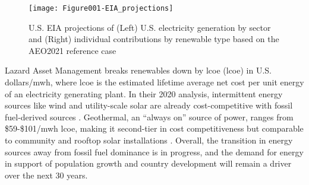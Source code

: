 \begin{figure}[htp]
\centering
\texttt{[image: Figure001-EIA\_projections]}
\caption[U.S. EIA projections based on the AEO2021 reference case]{U.S. EIA projections of (Left) U.S. electricity generation by sector and (Right) individual contributions by renewable type based on the AEO2021 reference case \protect\citep{us_energy_information_administration_annual_2021}}
\label{fig:eia_2021_projections}
\end{figure}

Lazard Asset Management breaks renewables down by \acrlong{lcoe} (\acrshort{lcoe}) in U.S. dollars/\acrshort{mwh}, where \acrshort{lcoe} is the estimated lifetime average net cost per unit energy of an electricity generating plant. In their 2020 analysis, intermittent energy sources like wind and utility-scale solar are already cost-competitive with fossil fuel-derived sources \citep{lazard_lazards_2020}. Geothermal, an “always on” source of power, ranges from \$59-\$101/\acrshort{mwh}  \acrshort{lcoe}, making it second-tier in cost competitiveness but comparable to community and rooftop solar installations \citep{lazard_lazards_2020}. Overall, the transition in energy sources away from fossil fuel dominance is in progress, and the demand for energy in support of population growth and country development will remain a driver over the next 30 years.

